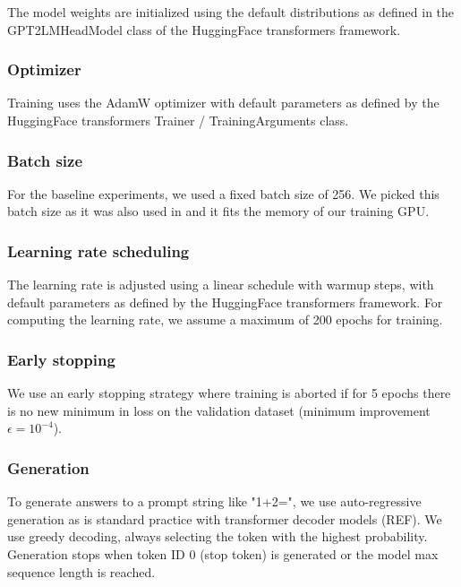 The model weights are initialized using the default distributions as defined in the GPT2LMHeadModel class of the HuggingFace transformers framework.

\subsubsection{Optimizer}

Training uses the AdamW optimizer with default parameters as defined by the HuggingFace transformers Trainer / TrainingArguments class.

\subsubsection{Batch size}
\label{expsetup:batchsize}

For the baseline experiments, we used a fixed batch size of 256. We picked this batch size as it was also used in \cite{teaching} and it fits the memory of our training GPU.

\subsubsection{Learning rate scheduling}
\label{expsetup:learnrate}

The learning rate is adjusted using a linear schedule with warmup steps, with default parameters as defined by the HuggingFace transformers framework.
For computing the learning rate, we assume a maximum of 200 epochs for training.

\subsubsection{Early stopping}
\label{early_stopping}

We use an early stopping strategy where training is aborted if for 5 epochs there is no new minimum in loss on the validation dataset (minimum improvement $\epsilon=10^{-4}$).

\subsubsection{Generation}

To generate answers to a prompt string like "1+2=", we use auto-regressive generation as is standard practice with transformer decoder models (REF). We use greedy decoding, always selecting the token with the highest probability. Generation stops when token ID 0 (stop token) is generated or the model max sequence length is reached.
\label{model_generation}

